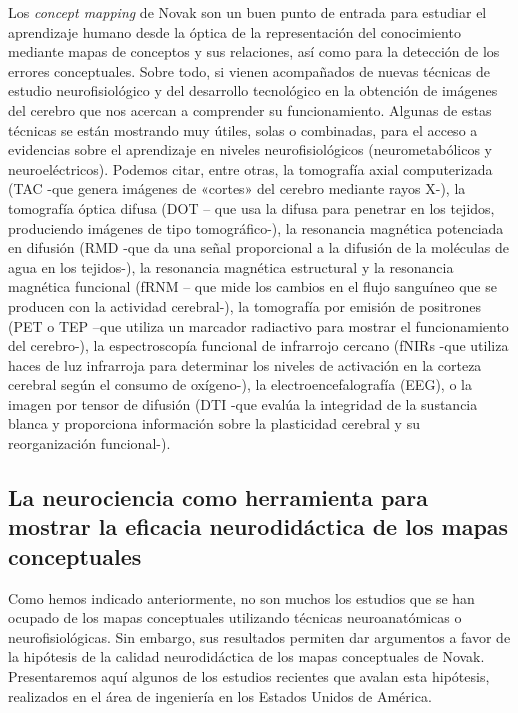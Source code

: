 \documentclass[spanish]{textolivre}
\begin{document}
Los \textit{concept mapping} de Novak son un buen punto de entrada para estudiar el aprendizaje humano desde la óptica de la representación del conocimiento mediante mapas de conceptos y sus relaciones, así como para la detección de los errores conceptuales. Sobre todo, si vienen acompañados de nuevas técnicas de estudio neurofisiológico y del desarrollo tecnológico en la obtención de imágenes del cerebro que nos acercan a comprender su funcionamiento. Algunas de estas técnicas se están mostrando muy útiles, solas o combinadas, para el acceso a evidencias sobre el aprendizaje en niveles neurofisiológicos (neurometabólicos y neuroeléctricos). Podemos citar, entre otras, la tomografía axial computerizada (TAC -que genera imágenes de «cortes» del cerebro mediante rayos X-), la tomografía óptica difusa (DOT – que usa la difusa para penetrar en los tejidos, produciendo imágenes de tipo tomográfico-), la resonancia magnética potenciada en difusión (RMD -que da una señal proporcional a la difusión de la moléculas de agua en los tejidos-), la resonancia magnética estructural y la resonancia magnética funcional (fRNM – que mide los cambios en el flujo sanguíneo que se producen con la actividad cerebral-), la tomografía por emisión de positrones (PET o TEP –que utiliza un marcador radiactivo para mostrar el funcionamiento del cerebro-), la espectroscopía funcional de infrarrojo cercano (fNIRs -que utiliza haces de luz infrarroja para determinar los niveles de activación en la corteza cerebral según el consumo de oxígeno-), la electroencefalografía (EEG), o la imagen por tensor de difusión (DTI -que evalúa la integridad de la sustancia blanca y proporciona información sobre la plasticidad cerebral y su reorganización funcional-).


\subsection{La neurociencia como herramienta para mostrar la eficacia neurodidáctica de los mapas conceptuales}\label{sec-neurociencia}

Como hemos indicado anteriormente, no son muchos los estudios que se han ocupado de los mapas conceptuales utilizando técnicas neuroanatómicas o neurofisiológicas. Sin embargo, sus resultados permiten dar argumentos a favor de la hipótesis de la calidad neurodidáctica de los mapas conceptuales de Novak. Presentaremos aquí algunos de los estudios recientes que avalan esta hipótesis, realizados en el área de ingeniería en los Estados Unidos de América.
\end{document}
